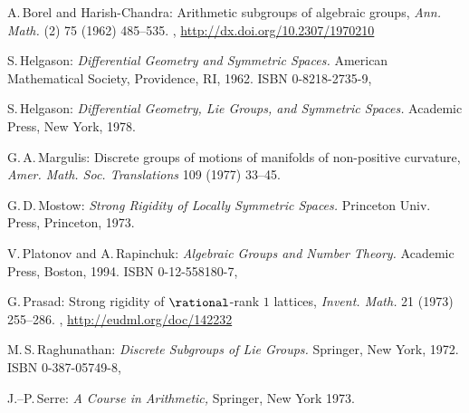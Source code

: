 \begin{references}{9}

 A.\,Borel and Harish-Chandra:
 Arithmetic subgroups of algebraic groups,
\emph{Ann. Math.} (2) 75 (1962) 485--535.
 ,
 \maynewline
 \url{http://dx.doi.org/10.2307/1970210}


 S.\,Helgason:
 \emph{Differential Geometry and Symmetric Spaces.}
 American Mathematical Society, Providence, RI, 1962. 
   ISBN 0-8218-2735-9,

 S.\,Helgason:
 \emph{Differential Geometry, Lie Groups, and Symmetric Spaces.}
 Academic Press, New York, 1978.

 G.\,A.\,Margulis: 
 Discrete groups of motions of manifolds of non-positive curvature,
 \emph{Amer. Math. Soc. Translations} 109 (1977) 33--45.

 G.\,D.\,Mostow:
 \emph{Strong Rigidity of Locally Symmetric Spaces.}
 Princeton Univ. Press, Princeton, 1973.

 V.\,Platonov and A.\,Rapinchuk: 
 \emph{Algebraic Groups and Number Theory.}
 Academic Press, Boston, 1994.
 ISBN 0-12-558180-7,

 G.\,Prasad:
 Strong rigidity of $\rational$-rank $1$ lattices,
 \emph{Invent. Math.} 21 (1973) 255--286. 
 ,
 \maynewline
 \url{http://eudml.org/doc/142232}

 M.\,S.\,Raghunathan: 
 \emph{Discrete Subgroups of Lie Groups.}
 Springer, {New York}, 1972.
 ISBN 0-387-05749-8,

 J.--P.\,Serre:
 \emph{A Course in Arithmetic,}
 Springer, New York 1973.

 \end{references}


